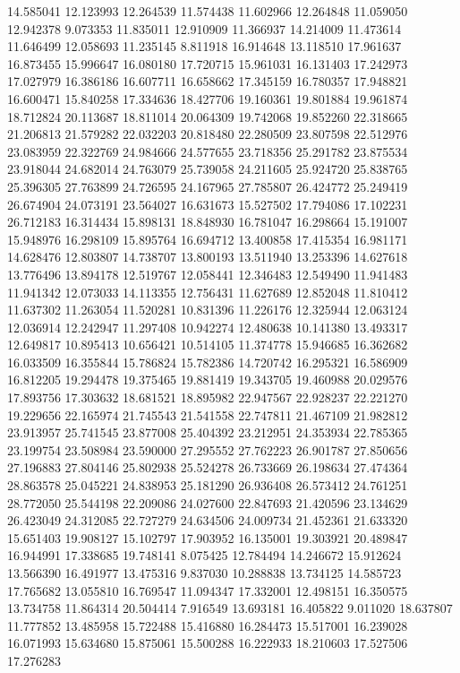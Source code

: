 14.585041
12.123993
12.264539
11.574438
11.602966
12.264848
11.059050
12.942378
9.073353
11.835011
12.910909
11.366937
14.214009
11.473614
11.646499
12.058693
11.235145
8.811918
16.914648
13.118510
17.961637
16.873455
15.996647
16.080180
17.720715
15.961031
16.131403
17.242973
17.027979
16.386186
16.607711
16.658662
17.345159
16.780357
17.948821
16.600471
15.840258
17.334636
18.427706
19.160361
19.801884
19.961874
18.712824
20.113687
18.811014
20.064309
19.742068
19.852260
22.318665
21.206813
21.579282
22.032203
20.818480
22.280509
23.807598
22.512976
23.083959
22.322769
24.984666
24.577655
23.718356
25.291782
23.875534
23.918044
24.682014
24.763079
25.739058
24.211605
25.924720
25.838765
25.396305
27.763899
24.726595
24.167965
27.785807
26.424772
25.249419
26.674904
24.073191
23.564027
16.631673
15.527502
17.794086
17.102231
26.712183
16.314434
15.898131
18.848930
16.781047
16.298664
15.191007
15.948976
16.298109
15.895764
16.694712
13.400858
17.415354
16.981171
14.628476
12.803807
14.738707
13.800193
13.511940
13.253396
14.627618
13.776496
13.894178
12.519767
12.058441
12.346483
12.549490
11.941483
11.941342
12.073033
14.113355
12.756431
11.627689
12.852048
11.810412
11.637302
11.263054
11.520281
10.831396
11.226176
12.325944
12.063124
12.036914
12.242947
11.297408
10.942274
12.480638
10.141380
13.493317
12.649817
10.895413
10.656421
10.514105
11.374778
15.946685
16.362682
16.033509
16.355844
15.786824
15.782386
14.720742
16.295321
16.586909
16.812205
19.294478
19.375465
19.881419
19.343705
19.460988
20.029576
17.893756
17.303632
18.681521
18.895982
22.947567
22.928237
22.221270
19.229656
22.165974
21.745543
21.541558
22.747811
21.467109
21.982812
23.913957
25.741545
23.877008
25.404392
23.212951
24.353934
22.785365
23.199754
23.508984
23.590000
27.295552
27.762223
26.901787
27.850656
27.196883
27.804146
25.802938
25.524278
26.733669
26.198634
27.474364
28.863578
25.045221
24.838953
25.181290
26.936408
26.573412
24.761251
28.772050
25.544198
22.209086
24.027600
22.847693
21.420596
23.134629
26.423049
24.312085
22.727279
24.634506
24.009734
21.452361
21.633320
15.651403
19.908127
15.102797
17.903952
16.135001
19.303921
20.489847
16.944991
17.338685
19.748141
8.075425
12.784494
14.246672
15.912624
13.566390
16.491977
13.475316
9.837030
10.288838
13.734125
14.585723
17.765682
13.055810
16.769547
11.094347
17.332001
12.498151
16.350575
13.734758
11.864314
20.504414
7.916549
13.693181
16.405822
9.011020
18.637807
11.777852
13.485958
15.722488
15.416880
16.284473
15.517001
16.239028
16.071993
15.634680
15.875061
15.500288
16.222933
18.210603
17.527506
17.276283
